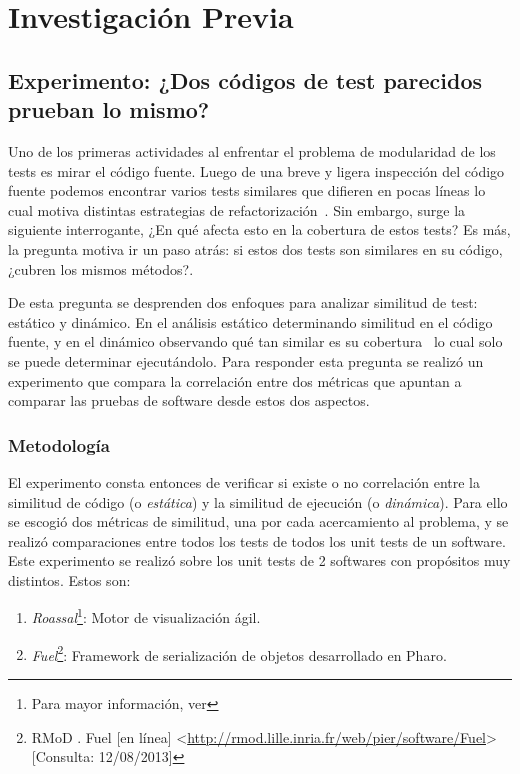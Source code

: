 \chapter{Investigación Previa}



\section{Experimento: ¿Dos códigos de test parecidos prueban lo mismo? }

\par Uno de los primeras actividades al enfrentar el problema de modularidad de los tests es mirar el código fuente. Luego de una breve y ligera inspección del código fuente podemos encontrar varios tests similares que difieren en pocas líneas lo cual motiva distintas estrategias de refactorización~\cite{roy2007survey,rattan2013software,Kosc13a}. Sin embargo, surge la siguiente interrogante, ¿En qué afecta esto en la cobertura de estos tests? Es más, la pregunta motiva ir un paso atrás: si estos dos tests son similares en su código, ¿cubren los mismos métodos?.

\par De esta pregunta se desprenden dos enfoques para analizar similitud de test: estático y dinámico. En el análisis estático determinando similitud en el código fuente, y en el dinámico observando qué tan similar es su cobertura~\cite{Horwi02a} lo cual solo se puede determinar ejecutándolo. Para responder esta pregunta se realizó un experimento que compara la correlación entre dos métricas que apuntan a comparar las pruebas de software desde estos dos aspectos.

\subsection{Metodología}

\par El experimento consta entonces de verificar si existe o no correlación entre la similitud de código (o \emph{estática}) y la similitud de ejecución (o \emph{dinámica}). Para ello se escogió dos métricas de similitud, una por cada acercamiento al problema, y se realizó comparaciones entre todos los tests de todos los unit tests de un software. Este experimento se realizó sobre los unit tests de 2 softwares con propósitos muy distintos. Estos son: 

\begin{enumerate} 
\item \emph{Roassal}\footnote{Para mayor información, ver }: Motor de visualización ágil.
\item \emph{Fuel}\footnote{RMoD . Fuel [en línea] \textless\url{http://rmod.lille.inria.fr/web/pier/software/Fuel}\textgreater [Consulta: 12/08/2013] }: Framework de serialización de objetos desarrollado en Pharo.
\end{enumerate}

